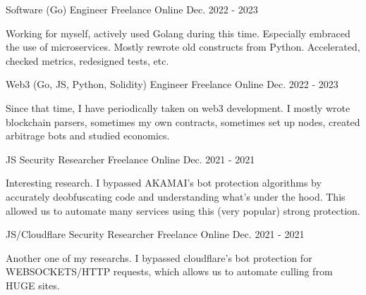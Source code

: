 \begin{cventries}

\cventry
{Software (Go) Engineer} %
{Freelance} %
{Online} %
{Dec. 2022 - 2023} %
{ %
\begin{cvitems}
\item { Working for myself, actively used Golang during this time. Especially embraced the use of microservices. Mostly rewrote old constructs from Python. Accelerated, checked metrics, redesigned tests, etc.  } 
\end{cvitems}
}


\cventry
{Web3 (Go, JS, Python, Solidity) Engineer} %
{Freelance} %
{Online} %
{Dec. 2022 - 2023} %
{ %
\begin{cvitems}
\item { Since that time, I have periodically taken on web3 development. I mostly wrote blockchain parsers, sometimes my own contracts, sometimes set up nodes, created arbitrage bots and studied economics.  } 
\end{cvitems}
}


\cventry
{JS Security Researcher } %
{Freelance} %
{Online} %
{Dec. 2021 - 2021} %
{ %
\begin{cvitems}
\item { Interesting research. I bypassed AKAMAI's bot protection algorithms by accurately deobfuscating code and understanding what's under the hood. This allowed us to automate many services using this (very popular) strong protection.  }
\end{cvitems}
}


\cventry
{JS/Cloudflare Security Researcher } %
{Freelance} %
{Online} %
{Dec. 2021 - 2021} %
{ %
\begin{cvitems}
\item { Another one of my researchs. I bypassed cloudflare's bot protection for WEBSOCKETS/HTTP requests, which allows us to automate culling from HUGE sites. } 
\end{cvitems}
}


\end{cventries}
